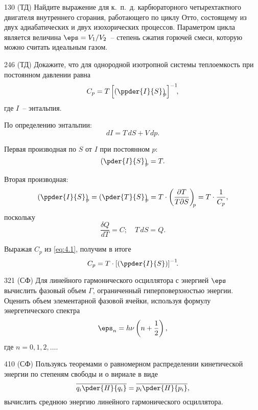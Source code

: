 \documentclass[pscyr]{hedwork}
\begin{document}
  \begin{task}{130 (ТД)}{
    Найдите выражение для к.~п.~д. карбюраторного четырехтактного двигателя
    внутреннего сгорания, работающего по циклу Отто, состоящему из двух
    адиабатических и двух изохорических процессов. Параметром цикла является
    величина \( \eps = V_1 / V_2 \)~-- степень сжатия горючей смеси, которую
    можно считать идеальным газом.
  }

  \end{task}

  \begin{task}{246 (ТД)}{
    Докажите, что для однородной изотропной системы теплоемкость при постоянном
    давлении равна
    \[
      C_p = T\left[\left(\ppder{I}{S}\right)_{\!\!p}\right]^{-1} \!\!,
    \]
    где \( I \)~-- энтальпия.
  }
  
    По определению энтальпии:
    \[
      dI = T\,dS + V\,dp.
    \]
    
    Первая производная по \( S \) от \( I \) при постоянном \( p \):
    \[
      \left(\pder{I}{S}\right)_{\!\!p} = T.
    \]
    
    Вторая производная:
    \begin{equation}
      \left(\ppder{I}{S}\right)_{\!\!p} = \left(\pder{T}{S}\right)_{\!\!p} = 
        T \cdot \left(\frac{\partial T}{T\partial S}\right)_{\!\!p} = 
        T \cdot \frac{1}{C_p},
      \label{eq:4.1}
    \end{equation}
    поскольку
    \[
      \frac{\delta Q}{dT} = C; \quad T\,dS = Q.
    \]
    
    Выражая \( C_p \) из \eqref{eq:4.1}, получим в итоге
    \[
      C_p = T \cdot \left[\left(\ppder{I}{S}\right)\right]^{-1}\!\!.
    \]

  \end{task}

  \begin{task}{321 (СФ)}{
    Для линейного гармонического осциллятора с энергией \( \eps \) вычислить
    фазовый объем \( \Gamma \), ограниченный гиперповерхностью энергии. Оценить
    объем элементарной фазовой ячейки, используя формулу энергетического спектра
    \[
      \eps_n = h\nu \left(n + \frac{1}{2}\right),
    \]
    где \( n = 0, 1, 2, \ldots \).
  }

  \end{task}

  \begin{task}{410 (СФ)}{
    Пользуясь теоремами о равномерном распределении кинетической энергии по
    степеням свободы и о вириале в виде
    \[
      \overline{q_i\pder{H}{q_i}} = \overline{p_i\pder{H}{p_i}},
    \]
    вычислить среднюю энергию линейного гармонического осциллятора.
  }

  \end{task}
\end{document}
